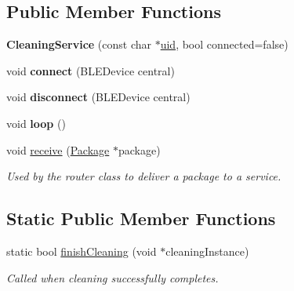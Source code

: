 \subsection*{Public Member Functions}
\begin{DoxyCompactItemize}
\item 
{\bfseries Cleaning\+Service} (const char $\ast$\hyperlink{class_bottle_buddy_1_1_embedded_1_1_pipeline_1_1_service_af290f9aa0a6dca36e802e615fab19f78}{uid}, bool connected=false)\hypertarget{class_bottle_buddy_1_1_embedded_1_1_pipeline_1_1_services_1_1_cleaning_service_ae9c3e69b06b31505540b274e8f00cf9d}{}\label{class_bottle_buddy_1_1_embedded_1_1_pipeline_1_1_services_1_1_cleaning_service_ae9c3e69b06b31505540b274e8f00cf9d}

\item 
void {\bfseries connect} (B\+L\+E\+Device central)\hypertarget{class_bottle_buddy_1_1_embedded_1_1_pipeline_1_1_services_1_1_cleaning_service_aed7ca1580dbfadaa0f009283df62cd5d}{}\label{class_bottle_buddy_1_1_embedded_1_1_pipeline_1_1_services_1_1_cleaning_service_aed7ca1580dbfadaa0f009283df62cd5d}

\item 
void {\bfseries disconnect} (B\+L\+E\+Device central)\hypertarget{class_bottle_buddy_1_1_embedded_1_1_pipeline_1_1_services_1_1_cleaning_service_aa3588e480fd6aa5d19e0cb78826798d9}{}\label{class_bottle_buddy_1_1_embedded_1_1_pipeline_1_1_services_1_1_cleaning_service_aa3588e480fd6aa5d19e0cb78826798d9}

\item 
void {\bfseries loop} ()\hypertarget{class_bottle_buddy_1_1_embedded_1_1_pipeline_1_1_services_1_1_cleaning_service_a86e7fd7dfa11b12b7d10463a232f105e}{}\label{class_bottle_buddy_1_1_embedded_1_1_pipeline_1_1_services_1_1_cleaning_service_a86e7fd7dfa11b12b7d10463a232f105e}

\item 
void \hyperlink{class_bottle_buddy_1_1_embedded_1_1_pipeline_1_1_services_1_1_cleaning_service_a6d3dee7ca6387c00cec3478821b1ea23}{receive} (\hyperlink{class_bottle_buddy_1_1_embedded_1_1_pipeline_1_1_package}{Package} $\ast$package)
\begin{DoxyCompactList}\small\item\em Used by the router class to deliver a package to a service. \end{DoxyCompactList}\end{DoxyCompactItemize}
\subsection*{Static Public Member Functions}
\begin{DoxyCompactItemize}
\item 
static bool \hyperlink{class_bottle_buddy_1_1_embedded_1_1_pipeline_1_1_services_1_1_cleaning_service_a122a4f47c702c950ed601050e5be9242}{finish\+Cleaning} (void $\ast$cleaning\+Instance)
\begin{DoxyCompactList}\small\item\em Called when cleaning successfully completes. \end{DoxyCompactList}\end{DoxyCompactItemize}
